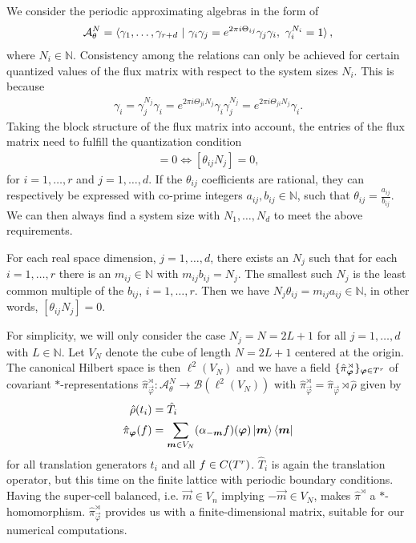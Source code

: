 \documentclass[submission, Phys]{SciPost}
\begin{document}
We consider the periodic approximating algebras in the form of \cite[Ch. 4.4]{Prodan2017}
\begin{align}
    \mathcal{A}_\theta^N
    = \braket{\gamma_1,\ldots, \gamma_{r+d} ~|~ 
    \gamma_i \gamma_j =  e^{2\pi i \Theta_{ij}}
    \gamma_j \gamma_i,~ \gamma_i^{N_i}=1},
\end{align}
where $N_i \in \mathbb{N}$.
Consistency among the relations can only be achieved for certain quantized values of the flux matrix with respect to the system sizes $N_i$.
This is because
\begin{align}
   \gamma_i = \gamma_j^{N_j} \gamma_i =  e^{2\pi i \Theta_{ji} N_j} \gamma_i  \gamma_j^{N_j}  = e^{2\pi i \Theta_{ji} N_j} \gamma_i .
\end{align}
Taking the block structure of the flux matrix into account, the entries of the flux matrix need to fulfill the quantization condition
\begin{align}
   [ \Theta_{ji} N_j]=0 \Leftrightarrow [\theta_{ij} N_j] = 0,
\end{align}
for $i=1,\ldots,r$ and $j =1,\ldots,d$.
If the $\theta_{ij}$ coefficients are rational, they can respectively be expressed with co-prime integers $a_{ij}, b_{ij}\in\mathbb{N}$, such that $\theta_{ij}=\frac{a_{ij}}{b_{ij}}$. We can then always find a system size with $N_1,\dots, N_d$ to meet the above requirements.

For each real space dimension, $j=1,\dots,d$, there exists an $N_j$ such that for each $i=1,\dots,r$ there is an $m_{ij}\in\mathbb{N}$ with $m_{ij} b_{ij}=N_j$. The smallest such $N_j$ is the least common multiple of the $b_{ij}$, $i=1,\dots,r$. 
Then we have $N_j\theta_{ij}=m_{ij} a_{ij} \in \mathbb{N}$, in other words, $[\theta_{ij} N_j] = 0$.

For simplicity, we will only consider the case $N_j = N = 2L+1$ for all $j =1,\ldots,d$ with $L\in\mathbb{N}$.
Let $V_N$ denote the cube of length $N=2L+1$ centered at the origin.
The canonical Hilbert space is then $\ell^2(V_N)$ and we have a field $\{\hat{\pi}^\rtimes_{\boldsymbol{\varphi}}\}_{\boldsymbol{\varphi}\in T^r}$ of covariant $\ast$-representations
$\hat{\pi}^\rtimes_{\vec{\varphi}} \colon\mathcal{A}_\theta^N \to \mathcal{B}(\ell^2(V_N)) $ with $\hat{\pi}^\rtimes_{\vec{\varphi}} = \hat{\pi}_{\vec{\varphi}} \rtimes \hat{\rho}$
given by
\begin{align}
     \hat{\rho}(t_i) &=  \hat{T}_i
     \\
     \hat{\pi}_{\boldsymbol{\varphi}}(f) &
     =\sum_{\boldsymbol{m} \in V_N} (\alpha_{-\boldsymbol{m}}f)(\boldsymbol{\varphi}) \ket{\boldsymbol{m}}\bra{\boldsymbol{m}}
\end{align}
for all translation generators $t_i$ and all $f \in C(T^r)$.
$\hat{T}_i$ is again the translation operator, but this time on the finite lattice with periodic boundary conditions.
Having the super-cell balanced, i.e. $\vec{m}\in V_n$ implying $-\vec{m}\in V_N$, makes $\hat{\pi}^\rtimes$ a $\ast$-homomorphism.
$\hat{\pi}^\rtimes_{\vec{\varphi}}$ provides us with a finite-dimensional matrix, suitable for our numerical computations.
\end{document}
